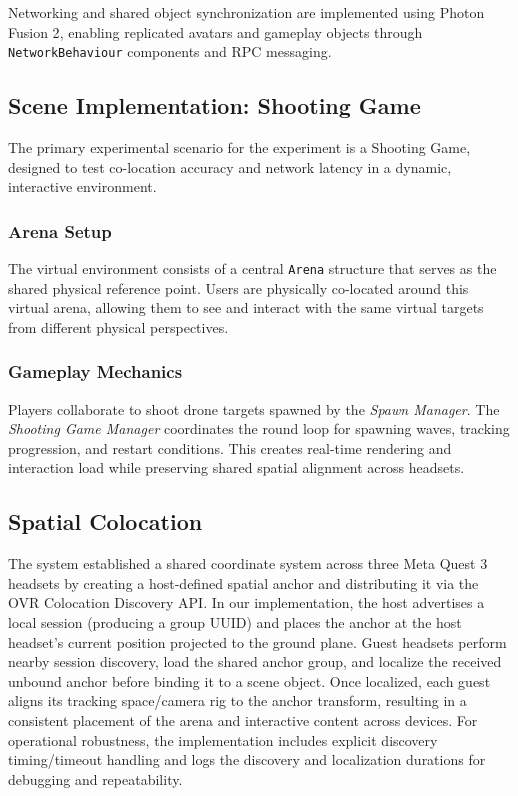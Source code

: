 Networking and shared object synchronization are implemented using Photon Fusion 2\cite{PhotonFusionDocs,MetaMultiplayerBuildingBlocks2025}, enabling replicated avatars and gameplay objects through \texttt{NetworkBehaviour} components and RPC messaging.



\subsection{Scene Implementation: Shooting Game}

The primary experimental scenario for the experiment is a Shooting Game, designed to test co-location accuracy and network latency in a dynamic, interactive environment.

\subsubsection{Arena Setup}

The virtual environment consists of a central \texttt{Arena} structure that serves as the shared physical reference point. Users are physically co-located around this virtual arena, allowing them to see and interact with the same virtual targets from different physical perspectives.

\subsubsection{Gameplay Mechanics}
Players collaborate to shoot drone targets spawned by the \textit{Spawn Manager}. The \textit{Shooting Game Manager} coordinates the round loop for spawning waves, tracking progression, and restart conditions. This creates real-time rendering and interaction load while preserving shared spatial alignment across headsets.


\subsection{Spatial Colocation}
\label{sec:prototype-colocation}

The system established a shared coordinate system across three Meta Quest 3 headsets by creating a host-defined spatial anchor and distributing it via the OVR Colocation Discovery API\cite{MetaColocationDiscovery2025}. In our implementation, the host advertises a local session (producing a group UUID) and places the anchor at the host headset's current position projected to the ground plane. Guest headsets perform nearby session discovery, load the shared anchor group, and localize the received unbound anchor before binding it to a scene object. Once localized, each guest aligns its tracking space/camera rig to the anchor transform, resulting in a consistent placement of the arena and interactive content across devices.
For operational robustness, the implementation includes explicit discovery timing/timeout handling and logs the discovery and localization durations for debugging and repeatability.

